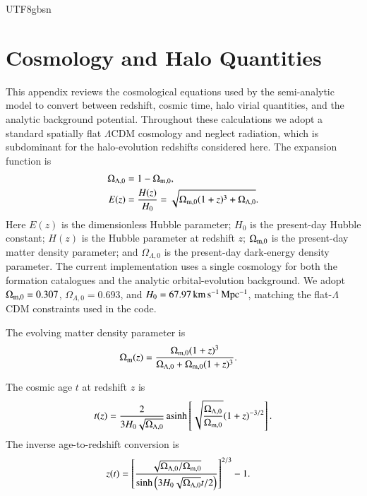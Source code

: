 \documentclass[trackchanges, twocolappendix, twocolumn]{aastex701}
\begin{document}
\begin{CJK*}{UTF8}{gbsn}
\appendix

\section{Cosmology and Halo Quantities}
\label{app:cosmology_equations}

This appendix reviews the cosmological equations used by the semi-analytic model to convert between redshift, cosmic time, halo virial quantities, and the analytic background potential. Throughout these calculations we adopt a standard spatially flat $\Lambda$CDM cosmology and neglect radiation, which is subdominant for the halo-evolution redshifts considered here. The expansion function is
\begin{align}
\Omega_{\Lambda ,0} & = 1 - \Omega_{\rm m, 0} ,\\
E(z) & = \dfrac{H (z)}{H_0} = \sqrt{\Omega_{\rm m, 0} (1 + z)^3 + \Omega_{\Lambda, 0}} .
\end{align}
Here $E(z)$ is the dimensionless Hubble parameter; $H_0$ is the present-day Hubble constant; $H(z)$ is the Hubble parameter at redshift $z$; $\Omega_{\rm m,0}$ is the present-day matter density parameter; and $\Omega_{\Lambda,0}$ is the present-day dark-energy density parameter. The current implementation uses a single cosmology for both the formation catalogues and the analytic orbital-evolution background. We adopt $\Omega_{\rm m,0}=0.307$, $\Omega_{\Lambda,0}=0.693$, and $H_0=67.97\,{\rm km\,s^{-1}\,Mpc^{-1}}$, matching the \cite{DESIcollaboration2025} flat-$\Lambda$CDM constraints used in the code.

The evolving matter density parameter is
\begin{align}
\Omega_{\rm m}(z) &=
\dfrac{\Omega_{\rm m,0}(1+z)^3}
{\Omega_{\Lambda,0}+\Omega_{\rm m,0}(1+z)^3}.
\end{align}

The cosmic age $t$ at redshift $z$ is
\begin{align}
t(z) = \dfrac{2}{3 H_0 \sqrt{\Omega_{\Lambda,0}}} \operatorname{asinh} \left[ \sqrt{\dfrac{\Omega_{\Lambda,0}}{\Omega_{\rm m,0}}} (1 + z)^{-3/2} \right] .
\end{align}
The inverse age-to-redshift conversion is
\begin{align}
z(t) &= \left[ \dfrac{\sqrt{\Omega_{\Lambda, 0} / \Omega_{\rm m, 0}}}{\sinh \left( 3 H_0 \sqrt{\Omega_{\Lambda,0}} t / 2 \right)} \right]^{2/3} - 1 .
\end{align}


\end{CJK*}
\end{document}
